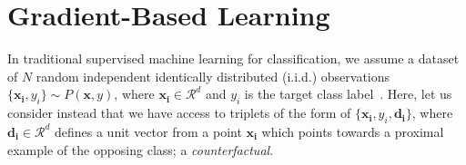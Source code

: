 \documentclass[sigconf,anonymous]{aamas}
\begin{document}




\section{Gradient-Based Learning}
In traditional supervised machine learning for classification, we assume a dataset of $N$ random independent identically distributed (i.i.d.) observations $\{\mathbf{x_i}, y_i\} \sim P(\mathbf{x},y)$, where $\mathbf{x_i}\in\mathcal{R}^d$ and $y_i$ is the target class label~\cite{hastie2009elements}. Here, let us consider instead that we have access to triplets of the form of $\{\mathbf{x_i}, y_i, \mathbf{d_i}\}$, where $\mathbf{d_i}\in\mathcal{R}^d$ defines a unit vector from a point $\mathbf{x_i}$ which points towards a proximal example of the opposing class; a \emph{counterfactual}.
\end{document}
